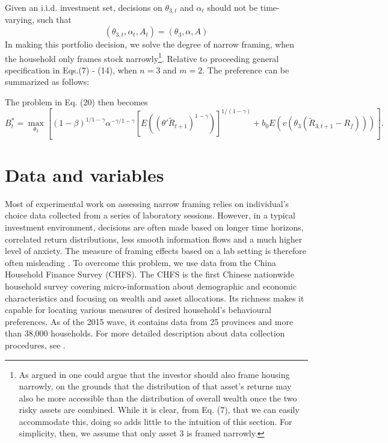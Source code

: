 \documentclass[ukenglish,nottitlepage,thmsb,11pt,letterpaper]{article}
\begin{document}
Given an i.i.d. investment set, decisions on $\theta _{3,t}$ and $\alpha_t$ should not be time-varying, such that
\begin{equation*}
(\theta_{3,t}, \alpha_t, A_t) = (\theta_3, \alpha, A)
\end{equation*}
In making this portfolio decision, we solve the degree of narrow framing, when the household only frames stock  narrowly\footnote{As argued in \citet{Barberis2009} one could argue that the investor should also frame housing narrowly, on the grounds that the distribution of that asset’s returns may also be more accessible than the distribution of overall wealth once the two risky assets are combined. While it is clear, from Eq. (7), that we can easily accommodate this, doing so adds little to the intuition of this section. For simplicity, then, we assume that only asset 3 is framed narrowly.}. Relative to proceeding  general specification in Eqs.(7) - (14), when $n = 3$ and $m =2$.  The preference can be summarized as follows:




The problem in Eq. (20) then becomes
\begin{equation}
B^*_{t} = \underset {\theta_3}{\max} \left[ (1-\beta)^{1/1-\gamma} \alpha^{-\gamma/ 1-\gamma} [E((\theta' \widetilde{R}_{t+1})^{1-\gamma})]^{1/(1-\gamma)}  +  b_0 E ( v(\theta_{3} (\widetilde{R}_{3,t+1} - R_f) )) \right].
\end{equation}





\section{Data and variables}

Most of experimental work on assessing narrow framing relies on individual's choice data collected from a series of laboratory sessions. However, in a typical investment environment, decisions are often made based on longer time horizons, correlated return distributions, less smooth information flows and a much higher level of anxiety. The measure of framing effects based on a lab setting is therefore often misleading \citep{Beshears2016}. To overcome this problem, we use data from the China Household Finance Survey (CHFS). The CHFS is the first Chinese nationwide household survey covering micro-information about demographic and economic characteristics and focusing on wealth and asset allocations. Its richness makes it capable for locating various measures of desired household's behavioural preferences. As of the 2015 wave, it contains data from 25 provinces and more than 38,000 households. For more detailed description about data collection procedures, see \citet{Gan2013}.
\end{document}
